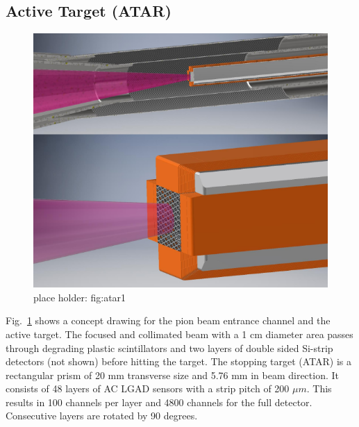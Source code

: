 \subsection{Active Target (ATAR)}
\begin{figure}[h!]
\centering
\includegraphics[scale=0.4]{sections/figures/atar1.png}
\caption{place holder: fig:atar1}
\label{fig:atar1}
\end{figure}

Fig.~\ref{fig:atar1} shows a concept drawing for  the pion beam entrance channel and  the active target. The  focused and collimated beam with a 1 cm diameter area passes through degrading plastic scintillators and two layers of double sided Si-strip detectors (not shown) before hitting the target. 
The stopping target (ATAR) is a rectangular prism of 20 mm transverse size and 5.76 mm in beam direction. It consists of 48 layers of AC LGAD sensors with a strip pitch of 200 $\mu m$. This results in 100 channels per layer and 4800 channels for the full detector. Consecutive layers are rotated by 90 degrees.



